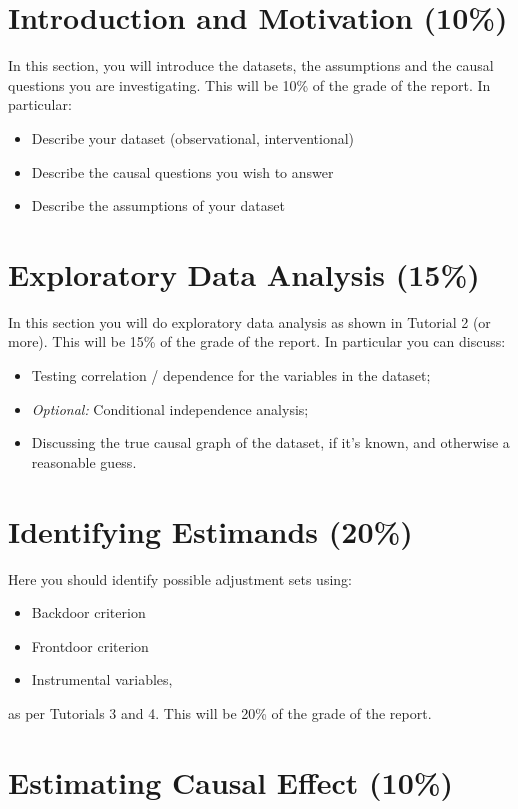 \section{Introduction and Motivation (10\%)}
In this section, you will introduce the datasets, the assumptions and the causal questions you are investigating. This will be 10\% of the grade of the report. In particular:
\begin{itemize}
    \item Describe your dataset (observational, interventional)
    \item Describe the causal questions you wish to answer
    \item Describe the assumptions of your dataset
\end{itemize}


\section{Exploratory Data Analysis (15\%)}
In this section you will do exploratory data analysis as shown in Tutorial 2 (or more). This will be 15\% of the grade of the report. In particular you can discuss:
\begin{itemize}
    \item Testing correlation / dependence for the variables in the dataset;
    \item \emph{Optional:} Conditional independence analysis;
    \item Discussing the true causal graph of the dataset, if it's known, and otherwise a reasonable guess.
\end{itemize}


\section{Identifying Estimands (20\%)}

Here you should identify possible adjustment sets using:
\begin{itemize}
    \item Backdoor criterion
    \item Frontdoor criterion
    \item Instrumental variables,
\end{itemize}
as per Tutorials 3 and 4.
This will be 20\% of the grade of the report.

\section{Estimating Causal Effect (10\%)}

